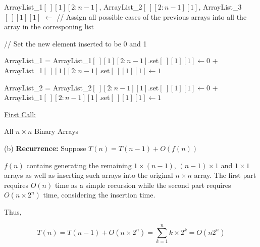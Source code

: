 \documentclass[10pt]{article}
\begin{document}
\begin{algorithm}
{		
		
		ArrayList\_1$[\ ][1][2:n-1]$, ArrayList\_2$[\ ][2:n-1][1]$, ArrayList\_3$[\ ][1][1]$ $\gets$  // Assign all possible cases of the previous arrays into all the array in the corresponing list
		
		// Set the new element inserted to be 0 and 1
		
		ArrayList\_1 = ArrayList\_1$[\ ][1][2:n-1]$.set$[\ ][1][1]\gets 0$ + ArrayList\_1$[\ ][1][2:n-1]$.set$[\ ][1][1]\gets 1$
		
		ArrayList\_2 = ArrayList\_2$[\ ][2:n-1][1]$.set$[\ ][1][1]\gets 0$ + ArrayList\_1$[\ ][2:n-1][1]$.set$[\ ][1][1]\gets 1$
		
		
	}

	\underline{First Call:} 

	\caption{All $n\times n$ Binary Arrays}
\end{algorithm}

(b) \textbf{Recurrence:} Suppose $T(n) = T(n-1) + O(f(n))$

$f(n)$ contains generating the remaining $1\times (n-1)$, $(n-1)\times 1$ and $1\times 1$ arrays as well as inserting such arrays into the original $n\times n$ array. The first part requires $O(n)$ time as a simple recursion while the second part requires $O(n\times 2^n)$ time, considering the insertion time.

Thus,

$$
T(n) = T(n-1) + O(n\times 2^n) = \sum_{k=1}^n k\times 2^k = O(n2^n)
$$



\newpage
\end{document}
